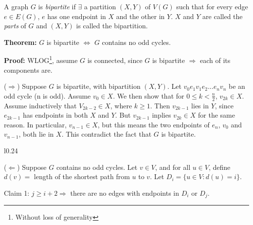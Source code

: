 \documentclass[11pt, letterpaper, oneside]{article}
\begin{document}
A graph $G$ is \textit{bipartite} if $\exists$ a partition $(X,Y)$ of $V(G)$ such that for every edge $e \in E(G)$, $e$ has one endpoint in $X$ and the other in $Y$. $X$ and $Y$ are called the \textit{parts} of $G$ and $(X,Y)$ is called the bipartition.

\textbf{Theorem:} $G$ is bipartite $\Leftrightarrow$ $G$ contains no odd cycles.

\textbf{Proof:} WLOG\footnote{Without loss of generality}, assume $G$ is connected, since $G$ is bipartite $\Rightarrow$ each of its components are.

($\Rightarrow$) Suppose $G$ is bipartite, with bipartition $(X,Y)$. Let $v_0 e_1 v_1 e_2 ... e_n v_n$ be an odd cycle (n is odd). Assume $v_0 \in X$. We then show that for $0 \leq k < \frac{n}{2}$, $v_{2k} \in X$. Assume inductively that $V_{2k-2} \in X$, where $k \geq 1$. Then $v_{2k-1}$ lies in $Y$, since $e_{2k-1}$ has endpoints in both $X$ and $Y$. But $v_{2k-1}$ inplies $v_{2k} \in X$  for the same reason. In particular, $v_{n-1} \in X$, but this means the two endpoints of $e_n$, $v_0$ and $v_{n-1}$, both lie in $X$. This contradict the fact that $G$ is bipartite.

\begin{wrapfigure}{l}{0.24\textwidth}
	\vspace*{-1cm}
\end{wrapfigure}

($\Leftarrow$) Suppose $G$ contains no odd cycles. Let $v \in V$, and for all $u \in V$, define $d(v) =$ length of the shortest path from $u$ to $v$. Let $D_i = \{u \in V: d(u)=i\}$.

Claim 1: $j \geq i+2 \Rightarrow$ there are no edges with endpoints in $D_i$ or $D_j$.
\end{document}
